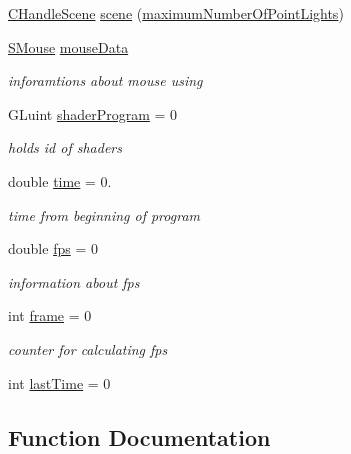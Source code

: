 \begin{DoxyCompactItemize}
\mbox{\hyperlink{classkrizpav6_1_1_c_handle_scene}{C\+Handle\+Scene}} \mbox{\hyperlink{namespacekrizpav6_acfe889a340fee22e70659028eaab6b3d}{scene}} (\mbox{\hyperlink{namespacekrizpav6_a5de8451389cb23317a51c171c120ed5b}{maximum\+Number\+Of\+Point\+Lights}})
\item 
\mbox{\hyperlink{structkrizpav6_1_1_s_mouse}{S\+Mouse}} \mbox{\hyperlink{namespacekrizpav6_afa928632c05804c44a91d715d320fb22}{mouse\+Data}}
\begin{DoxyCompactList}\small\item\em inforamtions about mouse using \end{DoxyCompactList}\item 
G\+Luint \mbox{\hyperlink{namespacekrizpav6_a62f68ac39bd943907741993a8df24cfa}{shader\+Program}} = 0
\begin{DoxyCompactList}\small\item\em holds id of shaders \end{DoxyCompactList}\item 
double \mbox{\hyperlink{namespacekrizpav6_a8891720fdfe0575d613886ce3cf96223}{time}} = 0.
\begin{DoxyCompactList}\small\item\em time from beginning of program \end{DoxyCompactList}\item 
double \mbox{\hyperlink{namespacekrizpav6_a8e74308de74231b06383aae119225e80}{fps}} = 0
\begin{DoxyCompactList}\small\item\em information about fps \end{DoxyCompactList}\item 
int \mbox{\hyperlink{namespacekrizpav6_a5f6efd918fbcd4a4055d6015bf9d4450}{frame}} = 0
\begin{DoxyCompactList}\small\item\em counter for calculating fps \end{DoxyCompactList}\item 
int \mbox{\hyperlink{namespacekrizpav6_ab6e319d7be8daaf4ad161c0b83adf296}{last\+Time}} = 0
\end{DoxyCompactItemize}


\subsection{Function Documentation}
\mbox{\label{namespacekrizpav6_a652b6bbf940fd2a51e800a1dfd21c951}} 

